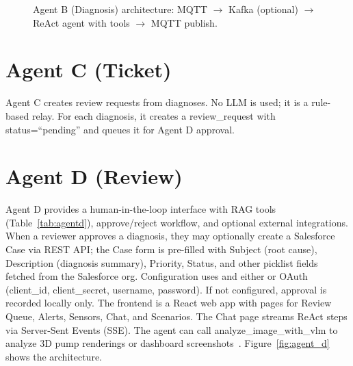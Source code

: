 \documentclass[12pt,letterpaper]{report}
\let\oldtexttt\texttt
\renewcommand{\texttt}[1]{\oldtexttt{\seqsplit{#1}}}
\begin{document}
\begin{figure}[htbp]
\centering
{}
\caption{Agent B (Diagnosis) architecture: MQTT $\rightarrow$ Kafka (optional) $\rightarrow$ ReAct agent with tools $\rightarrow$ MQTT publish.}
\label{fig:agent_b}
\end{figure}

\section{Agent C (Ticket)}

Agent C creates review requests from diagnoses. No LLM is used; it is a rule-based relay. For each diagnosis, it creates a review\_request with status=``pending'' and queues it for Agent D approval.

\section{Agent D (Review)}

Agent D provides a human-in-the-loop interface with RAG tools (Table~\ref{tab:agentd}), approve/reject workflow, and optional external integrations. When a reviewer approves a diagnosis, they may optionally create a Salesforce Case via REST API; the Case form is pre-filled with Subject (root cause), Description (diagnosis summary), Priority, Status, and other picklist fields fetched from the Salesforce org. Configuration uses \texttt{SALESFORCE\_DOMAIN} and either \texttt{SALESFORCE\_ACCESS\_TOKEN} or OAuth (client\_id, client\_secret, username, password). If not configured, approval is recorded locally only. The frontend is a React web app with pages for Review Queue, Alerts, Sensors, Chat, and Scenarios. The Chat page streams ReAct steps via Server-Sent Events (SSE). The agent can call analyze\_image\_with\_vlm to analyze 3D pump renderings or dashboard screenshots~\cite{li2022blip,liu2023llava}. Figure~\ref{fig:agent_d} shows the architecture.
\end{document}
